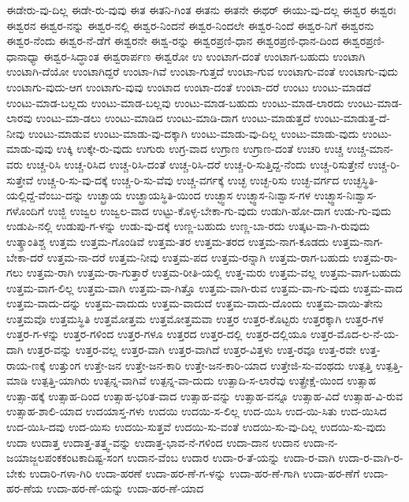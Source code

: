 {ಈಡೇರು-ವು-ದಿಲ್ಲ
ಈಡೇ-ರು-ವುವು
ಈತ
ಈತನಿ-ಗಿಂತ
ಈತನು
ಈತನೇ
ಈಥರ್
ಈಯು-ವು-ದಲ್ಲ
ಈಶ್ವರ
ಈಶ್ವರಃ
ಈಶ್ವರನ
ಈಶ್ವರ-ನನ್ನು
ಈಶ್ವರ-ನಲ್ಲಿ
ಈಶ್ವರ-ನಿಂದನೆ
ಈಶ್ವರ-ನಿಂದಲೇ
ಈಶ್ವರ-ನಿಂದೆ
ಈಶ್ವರ-ನಿಗೆ
ಈಶ್ವರನು
ಈಶ್ವರ-ನೆಂದು
ಈಶ್ವರ-ನೆ-ಡೆಗೆ
ಈಶ್ವರನೇ
ಈಶ್ವ-ರನ್ನು
ಈಶ್ವರಪ್ರಣಿ-ಧಾನ
ಈಶ್ವರಪ್ರಣಿ-ಧಾನ-ದಿಂದ
ಈಶ್ವರಪ್ರಣಿ-ಧಾನಾಧ್ಯಾ
ಈಶ್ವರ-ಸಿದ್ಧಾಂತ
ಈಶ್ವರಾರ್ಪಣ
ಈಶ್ವರೋ
ಉ
ಉಂಟಾಗ-ದಂತೆ
ಉಂಟಾಗ-ಬಹುದು
ಉಂಟಾಗಿ
ಉಂಟಾಗಿ-ದೆಯೋ
ಉಂಟಾಗಿದ್ದರೆ
ಉಂಟಾ-ಗಿವೆ
ಉಂಟಾ-ಗುತ್ತದೆ
ಉಂಟಾ-ಗುವ
ಉಂಟಾಗು-ವಂತೆ
ಉಂಟಾಗು-ವುದು
ಉಂಟಾಗು-ವುದು-ಆಗ
ಉಂಟಾಗು-ವುವು
ಉಂಟಾದ
ಉಂಟಾ-ದಂತೆ
ಉಂಟಾ-ದರೆ
ಉಂಟು
ಉಂಟು-ಮಾಡದೆ
ಉಂಟು-ಮಾಡ-ಬಲ್ಲದು
ಉಂಟು-ಮಾಡ-ಬಲ್ಲವು
ಉಂಟು-ಮಾಡ-ಬಹುದು
ಉಂಟು-ಮಾಡ-ಲಾರದು
ಉಂಟು-ಮಾಡ-ಲಾರವು
ಉಂಟು-ಮಾ-ಡಲು
ಉಂಟು-ಮಾಡಿದ
ಉಂಟು-ಮಾಡಿ-ದಾಗ
ಉಂಟು-ಮಾಡುತ್ತದೆ
ಉಂಟು-ಮಾಡುತ್ತ-ದೆ-ನೀವು
ಉಂಟು-ಮಾಡುವ
ಉಂಟು-ಮಾಡು-ವು-ದಕ್ಕಾಗಿ
ಉಂಟು-ಮಾಡು-ವು-ದಿಲ್ಲ
ಉಂಟು-ಮಾಡು-ವುದು
ಉಂಟು-ಮಾಡು-ವುವು
ಉಕ್ಕಿ
ಉಕ್ಕೇ-ರು-ವುದು
ಉಗುರು
ಉಗ್ರ-ವಾದ
ಉಗ್ರಾಣ
ಉಗ್ರಾಣ-ದಂತೆ
ಉಚರಿ
ಉಚ್ಚ
ಉಚ್ಚ-ಮಾನ-ವರು
ಉಚ್ಚ-ರಿಸಿ
ಉಚ್ಚ-ರಿಸಿದ
ಉಚ್ಚ-ರಿಸಿ-ದಂತೆ
ಉಚ್ಚ-ರಿಸಿ-ದರೆ
ಉಚ್ಚ-ರಿ-ಸುತ್ತಿದ್ದ-ನೆಂದು
ಉಚ್ಚ-ರಿಸುತ್ತೇನೆ
ಉಚ್ಚ-ರಿ-ಸುತ್ತೇವೆ
ಉಚ್ಚ-ರಿ-ಸು-ವು-ದಕ್ಕೆ
ಉಚ್ಚ-ರಿ-ಸು-ವೆವು
ಉಚ್ಚ-ವರ್ಗಕ್ಕೆ
ಉಚ್ಛ
ಉಚ್ಛ-ರಿಸು
ಉಚ್ಛ-ವರ್ಗದ
ಉಚ್ಛಸ್ಥಿತಿ-ಯಲ್ಲಿದ್ದೆ-ವೆಂಬು-ದನ್ನು
ಉಚ್ಛ್ರಾಯ
ಉಚ್ಛ್ರಾಯಸ್ಥಿತಿ-ಯಿಂದ
ಉಚ್ಛ್ವಾಸ
ಉಚ್ಛ್ವಾಸ-ನಿಃಶ್ವಾಸ-ಗಳ
ಉಚ್ಛ್ವಾಸ-ನಿಃಶ್ವಾಸ-ಗಳೊಂದಿಗೆ
ಉಜ್ಜಿ
ಉಜ್ವಲ
ಉಜ್ವಲ-ವಾದ
ಉಟ್ಟು-ಕೊಳ್ಳ-ಬೇಕಾ-ಗು-ವುದು
ಉಡುಗಿ-ಹೋ-ದಾಗ
ಉಡು-ಗು-ವುದು
ಉಡುಪಿ-ನಲ್ಲಿ
ಉಡುಪು-ಗ-ಳನ್ನು
ಉಡು-ವು-ದಕ್ಕೆ
ಉಣ್ಣ-ಬಹುದು
ಉಣ್ಣ-ಬಾ-ರದು
ಉತ್ಕಟ-ವಾ-ಗಿ-ರುವುದು
ಉತ್ಕ್ರಾಂತಿಶ್ಚ
ಉತ್ತಮ
ಉತ್ತಮ-ಗೊಂಡಿವೆ
ಉತ್ತಮ-ತರ
ಉತ್ತಮ-ತರದ
ಉತ್ತಮ-ನಾಗ-ಕೂಡದು
ಉತ್ತಮ-ನಾಗ-ಬೇಕಾ-ದರೆ
ಉತ್ತಮ-ನಾ-ದರೆ
ಉತ್ತಮ-ನೀವು
ಉತ್ತಮ-ಪದ
ಉತ್ತಮ-ರನ್ನಾಗಿ
ಉತ್ತಮ-ರಾಗ-ಬಹುದು
ಉತ್ತಮ-ರಾ-ಗಲು
ಉತ್ತಮ-ರಾಗಿ
ಉತ್ತಮ-ರಾ-ಗುತ್ತಾರೆ
ಉತ್ತಮ-ರೀತಿ-ಯಲ್ಲಿ
ಉತ್ತ-ಮರು
ಉತ್ತಮ-ವಲ್ಲ
ಉತ್ತಮ-ವಾಗ-ಬಹುದು
ಉತ್ತಮ-ವಾಗ-ಲಿಲ್ಲ
ಉತ್ತಮ-ವಾಗಿ
ಉತ್ತಮ-ವಾ-ಗಿತ್ತೊ
ಉತ್ತಮ-ವಾಗಿ-ರುವ
ಉತ್ತಮ-ವಾ-ಗು-ವುದು
ಉತ್ತಮ-ವಾದ
ಉತ್ತಮ-ವಾದು-ದನ್ನು
ಉತ್ತಮ-ವಾದುದು
ಉತ್ತಮ-ವಾದುದೆ
ಉತ್ತಮ-ವಾದು-ದೊಂದು
ಉತ್ತಮ-ವಾಯಿ-ತೇನು
ಉತ್ತಮವೊ
ಉತ್ತಮಸ್ಥಿತಿ
ಉತ್ತಮೋತ್ತಮ
ಉತ್ತಮೋತ್ತಮವಾ
ಉತ್ತರ
ಉತ್ತರ-ಕೊಟ್ಟರು
ಉತ್ತರಕ್ಕಾಗಿ
ಉತ್ತರ-ಗಳ
ಉತ್ತರ-ಗ-ಳನ್ನು
ಉತ್ತರ-ಗಳಿಂದ
ಉತ್ತರ-ಗಳೂ
ಉತ್ತರದ
ಉತ್ತರ-ದಲ್ಲಿ
ಉತ್ತರ-ದಲ್ಲಿಯೂ
ಉತ್ತರ-ಮೊದ-ಲ-ನೆ-ಯ-ದಾಗಿ
ಉತ್ತರ-ವನ್ನು
ಉತ್ತರ-ವಲ್ಲ
ಉತ್ತರ-ವಾಗಿ
ಉತ್ತರ-ವಾಗಿದೆ
ಉತ್ತರ-ವಿತ್ತಳು
ಉತ್ತ-ರವೂ
ಉತ್ತ-ರವೇ
ಉತ್ತ-ರಾಯ-ಣಕ್ಕೆ
ಉತ್ತುಂಗ
ಉತ್ತೇ-ಜನ
ಉತ್ತೇ-ಜನ-ಕಾರಿ
ಉತ್ತೇ-ಜನ-ಕಾರಿ-ಯಾದ
ಉತ್ತೇಜಿ-ಸು-ವಂಥದು
ಉತ್ಪತ್ತಿ
ಉತ್ಪತ್ತಿ-ಮಾಡಿ
ಉತ್ಪತ್ತಿ-ಯಾಗಿರು
ಉತ್ಪನ್ನ-ವಾಗಿವೆ
ಉತ್ಪನ್ನ-ವಾ-ದುದು
ಉತ್ಪಾದಿ-ಸ-ಲಾರೆವು
ಉತ್ಪ್ರೇಕ್ಷೆ-ಯಿಂದ
ಉತ್ಸಾಹ
ಉತ್ಸಾ-ಹಕ್ಕೆ
ಉತ್ಸಾಹ-ದಿಂದ
ಉತ್ಸಾಹ-ಭರಿತ-ವಾದ
ಉತ್ಸಾಹ-ವನ್ನು
ಉತ್ಸಾಹ-ವನ್ನೂ
ಉತ್ಸಾಹ-ವಿದೆ
ಉತ್ಸಾಹ-ವಿ-ರುವ
ಉತ್ಸಾಹ-ಶಾಲಿ-ಯಾದ
ಉದಯಾಸ್ತ-ಗಳು
ಉದಯಿ
ಉದಯಿ-ಸ-ಲಿಲ್ಲ
ಉದ-ಯಿಸಿ
ಉದ-ಯಿ-ಸಿತು
ಉದ-ಯಿಸಿದ
ಉದ-ಯಿಸಿ-ದವು
ಉದ-ಯಿಸು
ಉದಯಿ-ಸುತ್ತವೆ
ಉದಯಿ-ಸು-ವಂತೆ
ಉದಯಿ-ಸು-ವು-ದಿಲ್ಲ
ಉದಯಿ-ಸು-ವುದು
ಉದಾ
ಉದಾತ್ತ
ಉದಾತ್ತ-ತತ್ತ್ವ-ವನ್ನು
ಉದಾತ್ತ-ಭಾವ-ನೆ-ಗಳಿಂದ
ಉದಾ-ದಾನ
ಉದಾನ
ಉದಾ-ನ-ಜಯಾಜ್ಜಲಪಂಕಕಂಟಕಾದಿಷ್ಟ-ಸಂಗ
ಉದಾನ-ವೆಂಬ
ಉದಾರ
ಉದಾ-ರ-ತೆ-ಯನ್ನು
ಉದಾ-ರ-ವಾಗಿ
ಉದಾ-ರ-ವಾಗಿ-ರ-ಬೇಕು
ಉದಾರಿ-ಗಳಾ-ಗಿರಿ
ಉದಾ-ಹರಣೆ
ಉದಾ-ಹರ-ಣೆ-ಗ-ಳನ್ನು
ಉದಾ-ಹರ-ಣೆ-ಗಾಗಿ
ಉದಾ-ಹರ-ಣೆಗೆ
ಉದಾ-ಹರ-ಣೆಯ
ಉದಾ-ಹರ-ಣೆ-ಯನ್ನು
ಉದಾ-ಹರ-ಣೆ-ಯಾದ
}
